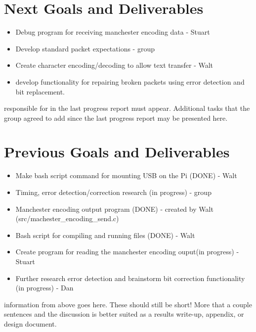 \documentclass{article}
\begin{document}
\section*{Next Goals and Deliverables}
\begin{itemize}
\item Debug program for receiving manchester encoding data - Stuart
\item Develop standard packet expectations - group
\item Create character encoding/decoding to allow text transfer - Walt
\item develop functionality for repairing broken packets using error detection and bit replacement.
\end{itemize}

responsible for in the last progress report must appear. Additional tasks that the
group agreed to add since the last progress report may be presented here.
\section*{Previous Goals and Deliverables}
\begin{itemize}
    \item Make bash script command for mounting USB on the Pi (DONE) - Walt
    \item Timing, error detection/correction research (in progress) - group
    \item Manchester encoding output program (DONE) - created by Walt (src/machester_encoding_send.c)
    \item Bash script for compiling and running files (DONE) - Walt
    \item Create program for reading the manchester encoding ouput(in progress) - Stuart
    \item Further research error detection and brainstorm bit correction functionality (in progress) - Dan
\end{itemize}

information from above goes here. These should still be short! More that a couple
sentences and the discussion is better suited as a results write-up, appendix, or
design document.
\end{document}
